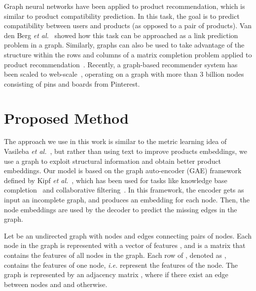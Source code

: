 \documentclass[10pt,twocolumn,letterpaper]{article}
\begin{document}
Graph neural networks have been applied to product recommendation, which is similar to product compatibility prediction. In this task, the goal is to predict compatibility between users and products (as opposed to a pair of products). Van den Berg \emph{et al.}~\cite{vdberg2017graph} showed how this task can be approached as a link prediction problem in a graph. Similarly, graphs can also be used to take advantage of the structure within the rows and columns of a matrix completion problem applied to product recommendation~\cite{kalofolias2014matrix, monti2017geometric_mc}. Recently, a graph-based recommender system has been scaled to web-scale~\cite{ying2018graph}, operating on a graph with more than 3 billion nodes consisting of pins and boards from Pinterest.












\section{Proposed Method}
\label{sec:method}


The approach we use in this work is similar to the metric learning idea of Vasileba \emph{et al.}~\cite{vasileva2018learning}, but rather than using text to improve products embeddings, we use a graph to exploit structural information and obtain better product embeddings. 
Our model is based on the graph auto-encoder (GAE) framework defined by Kipf \emph{et al.}~\cite{kipf2016variational}, which has been used for tasks like knowledge base completion~\cite{schlichtkrull2018modeling} and collaborative filtering~\cite{vdberg2017graph}.
In this framework, the encoder gets as input an incomplete graph, and produces an embedding for each node. Then, the node embeddings are used by the decoder to predict the missing edges in the graph.

Let  be an undirected graph with  nodes  and edges  connecting pairs of nodes. Each node in the graph is represented with a vector of features , and  is a  matrix that contains the features of all nodes in the graph. Each row of , denoted as , contains the features of one node, \textit{i.e.}  represent the features of the  node. 
The graph is represented by an adjacency matrix ,
where  if there exist an edge between nodes  and  and  otherwise.
\end{document}
